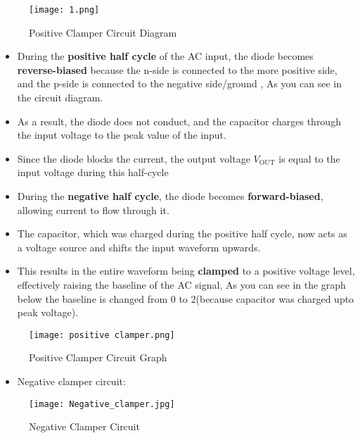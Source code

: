 \documentclass[9pt,conference]{IEEEtran}
\begin{document}
\begin{figure}[H]
    \centering
    \texttt{[image: 1.png]}
    \caption{Positive Clamper Circuit Diagram}
    \label{fig:positive_clamper}
\end{figure}
\begin{itemize}
    \item During the \textbf{positive half cycle} of the AC input, the diode becomes \textbf{reverse-biased} because the n-side is connected to the more positive side, and the p-side is connected to the negative side/ground , As you can see in the circuit diagram.
    \item As a result, the diode does not conduct, and the capacitor charges through the input voltage to the peak value of the input.
    \item Since the diode blocks the current, the output voltage \( V_{\text{OUT}} \) is equal to the input voltage during this half-cycle
    \item During the \textbf{negative half cycle}, the diode becomes \textbf{forward-biased}, allowing current to flow through it.
    \item The capacitor, which was charged during the positive half cycle, now acts as a voltage source and shifts the input waveform upwards.
    \item This results in the entire waveform being \textbf{clamped} to a positive voltage level, effectively raising the baseline of the AC signal, As you can see in the graph below the baseline is changed from 0 to 2(because capacitor was charged upto peak voltage).
\end{itemize}
\begin{figure}[H]
    \centering
    \texttt{[image: positive clamper.png]}
    \caption{Positive Clamper Circuit Graph}
    \label{fig:positive_clamper}
\end{figure}

\begin{itemize}
    \item Negative clamper circuit:
\end{itemize}
\begin{figure}[H]
    \centering
    \texttt{[image: Negative\_clamper.jpg]}
    \caption{Negative Clamper Circuit}
    \label{fig:negative_clamper}
\end{figure}
\end{document}
